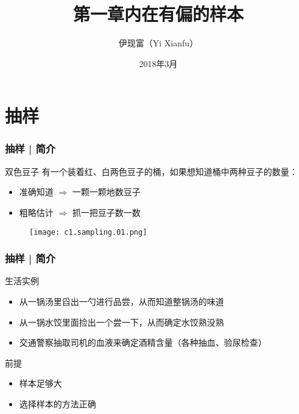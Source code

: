 



\title[抽样]{第一章\quad 内在有偏的样本}
\author[Yixf]{伊现富（Yi Xianfu）}
\date{2018年3月}



\section{抽样}
\begin{frame}
  \frametitle{抽样 | 简介}
  \begin{block}{双色豆子}
    有一个装着红、白两色豆子的桶，如果想知道桶中两种豆子的数量：
    \begin{itemize}
      \item 准确知道 $\Longrightarrow$ 一颗一颗地数豆子
      \item 粗略估计 $\Longrightarrow$ 抓一把豆子数一数
    \end{itemize}
  \end{block}
  \pause
  \begin{figure}
    \centering
    \texttt{[image: c1.sampling.01.png]}
  \end{figure}
\end{frame}

\begin{frame}
  \frametitle{抽样 | 简介}
  \begin{block}{生活实例}
    \begin{itemize}
      \item 从一锅汤里舀出一勺进行品尝，从而知道整锅汤的味道
      \item 从一锅水饺里面捡出一个尝一下，从而确定水饺熟没熟
      \item 交通警察抽取司机的血液来确定酒精含量（各种抽血、验尿检查）
    \end{itemize}
  \end{block}
  \pause
  \begin{block}{前提}
    \begin{itemize}
      \item 样本足够大
      \item 选择样本的方法正确
    \end{itemize}
  \end{block}
\end{frame}

